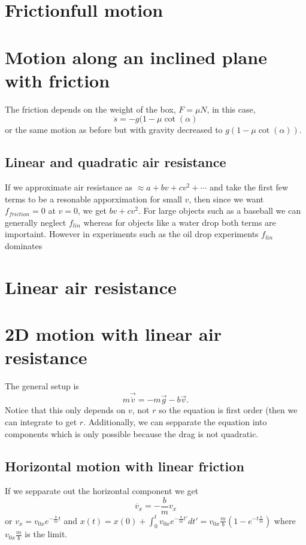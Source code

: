\documentclass{homework}
\begin{document}
\section{Frictionfull motion}



\section{Motion along an inclined plane with friction}

The friction depends on the weight of the box, $F = \mu N$, in this case,
\[\ddot s = -g(1 - \mu \cot (\alpha)\]
or the same motion as before but with gravity decreased to $g(1 - \mu \cot (\alpha))$.



\subsection{Linear and quadratic air resistance}
If we approximate air resistance as $\approx a + bv + cv^2 + \cdots$ and take the first few terms to be a resonable apporximation for small $v$, then since we want $f_{friction} = 0$ at $v = 0$, we get $bv + cv^2$. For large objects such as a baseball we can generally neglect $f_{lin}$ whereas for objects like a water drop both terms are importaint. However in experiments such as the oil drop experiments $f_{lin}$ dominates

\section{Linear air resistance}


\section{2D motion with linear air resistance}
The general setup is
\[m\vec{\dot{v}} = -m\vec{g} -b\vec{v}.\]
Notice that this only depends on $v$, not $r$ so the equation is first order (then we can integrate to get $r$. Additionally, we can sepparate the equation into components which is only possible because the drag is not quadratic. 

\subsection{Horizontal motion with linear friction}

If we sepparate out the horizontal component we get
\[\dot{v_x} = -\frac{b}{m}v_x\]
or $v_x = v_{0x}e^{-\frac{b}{m}t}$ and $x(t) = x(0) + \int_{0}^{t}v_{0x}e^{-\frac{b}{m}t'}dt' = v_{0x}\frac{m}{b}(1 - e^{-t\frac{b}{m}})$ where $v_{0x}\frac{m}{b}$ is the limit.
\end{document}
